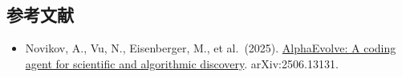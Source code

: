 \hypertarget{ux53c2ux8003ux6587ux732e-121}{%
\subsection{参考文献}\label{ux53c2ux8003ux6587ux732e-121}}

\vspace{0.25em}
\begin{itemize}
\tightlist
\item
  Novikov, A., Vu, N., Eisenberger, M., et al.~(2025). \href{https://arxiv.org/abs/2506.13131}{AlphaEvolve: A coding agent for scientific and algorithmic discovery}. arXiv:2506.13131.
\end{itemize}

\clearpage
